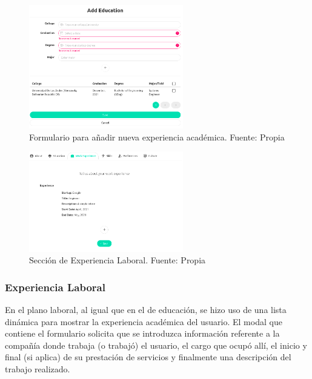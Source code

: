 \begin{figure}[H]
\centering
\includegraphics[width=0.60\textwidth]{img/23.png}
\caption{Formulario para añadir nueva experiencia académica. Fuente: Propia}
\label{figure:usersAcademy}
\end{figure}

\begin{figure}[H]
\centering
\includegraphics[width=0.60\textwidth]{img/24.png}
\caption{Sección de Experiencia Laboral. Fuente: Propia}
\label{figure:usersWork}
\end{figure}


\subsubsection{Experiencia Laboral}

En el plano laboral, al igual que en el de educación, se hizo uso de una lista dinámica para mostrar la experiencia académica del usuario. El modal que contiene el formulario solicita que se introduzca información referente a la compañía donde trabaja (o trabajó) el usuario, el cargo que ocupó allí, el inicio y final (si aplica) de su prestación de servicios y finalmente una descripción del trabajo realizado.

